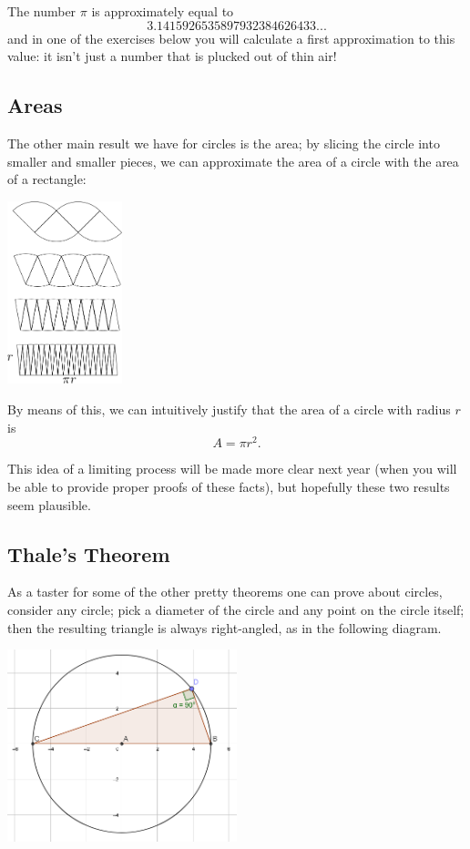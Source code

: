 The number $ \pi $ is approximately equal to
\begin{displaymath}
  3.1415926535897932384626433...
\end{displaymath}
and in one of the exercises below you will calculate a first approximation to this value: it isn't just
a number that is plucked out of thin air!

\subsection*{Areas}
The other main result we have for circles is the area; by slicing the circle into smaller and smaller pieces, we can
approximate the area of a circle with the area of a rectangle:
\begin{center}
  \includegraphics[width=0.25\textwidth]{area}
\end{center}
By means of this, we can intuitively justify that the area of a circle with radius $ r $ is
\begin{displaymath}
  A = \pi r^2.
\end{displaymath}

This idea of a limiting process will be made more clear next year (when you will be able to provide proper proofs of
these facts), but hopefully these two results seem plausible.

\subsection*{Thale's Theorem}
As a taster for some of the other pretty theorems one can prove about circles, consider any circle; pick a diameter of the
circle and any point on the circle itself; then the resulting triangle is always right-angled, as in the following diagram.
\begin{center}
  \includegraphics[width=0.5\textwidth]{thales}
\end{center}

